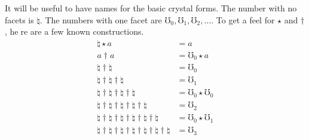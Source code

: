 \documentclass[12pt]{article}
\def\no{\natural}
\begin{document}
It will be useful to have names for the basic crystal forms.  The number with no facets is $\no$.
The numbers with one facet are $\mho_0,\mho_1,\mho_2, \ldots$.  To get a feel for $\star$ and $\dagger$, here are a few known constructions.
\begin{align*}
\no \star a &= a\\
a \dagger a &= \mho_0 \star a\\
\no \dagger \no &= \mho_0\\
\no \dagger \no \dagger \no &= \mho_1\\
\no \dagger \no \dagger \no \dagger \no&= \mho_0 \star \mho_0\\
\no \dagger \no \dagger \no \dagger \no \dagger \no&= \mho_2\\
\no \dagger \no \dagger \no \dagger \no \dagger \no \dagger \no&= \mho_0 \star \mho_1\\
\no \dagger \no \dagger \no \dagger \no \dagger \no \dagger \no \dagger \no&= \mho_3\\
\end{align*}
\end{document}
